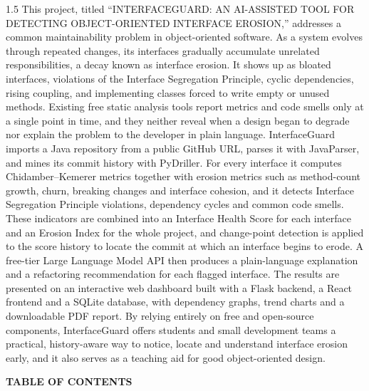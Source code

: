\documentclass[12pt,a4paper]{article}
\begin{document}
\begin{spacing}{1.5}
\justifying
This project, titled ``INTERFACEGUARD: AN AI-ASSISTED TOOL FOR DETECTING
OBJECT-ORIENTED INTERFACE EROSION,'' addresses a common maintainability
problem in object-oriented software. As a system evolves through repeated
changes, its interfaces gradually accumulate unrelated responsibilities,
a decay known as interface erosion. It shows up as bloated interfaces,
violations of the Interface Segregation Principle, cyclic dependencies,
rising coupling, and implementing classes forced to write empty or unused
methods. Existing free static analysis tools report metrics and code smells
only at a single point in time, and they neither reveal when a design began
to degrade nor explain the problem to the developer in plain language.
InterfaceGuard imports a Java repository from a public GitHub URL, parses
it with JavaParser, and mines its commit history with PyDriller. For every
interface it computes Chidamber--Kemerer metrics together with erosion
metrics such as method-count growth, churn, breaking changes and interface
cohesion, and it detects Interface Segregation Principle violations,
dependency cycles and common code smells. These indicators are combined
into an Interface Health Score for each interface and an Erosion Index for
the whole project, and change-point detection is applied to the score
history to locate the commit at which an interface begins to erode. A
free-tier Large Language Model API then produces a plain-language
explanation and a refactoring recommendation for each flagged interface.
The results are presented on an interactive web dashboard built with a
Flask backend, a React frontend and a SQLite database, with dependency
graphs, trend charts and a downloadable PDF report. By relying entirely
on free and open-source components, InterfaceGuard offers students and
small development teams a practical, history-aware way to notice, locate
and understand interface erosion early, and it also serves as a teaching
aid for good object-oriented design.
\end{spacing}

\newpage

\pagestyle{toc}

\begin{center}
{\large\bfseries TABLE OF CONTENTS}
\end{center}
\end{document}
